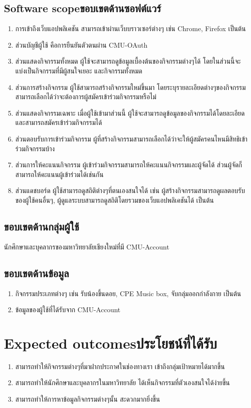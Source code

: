 \subsection{\ifenglish Software scope\else ขอบเขตด้านซอฟต์แวร์\fi}
\begin{enumerate}
    \item การเข้าถึงเว็บแอปพลิเคชัน สามารถเข้าผ่านเว็บบราวเซอร์ต่างๆ เช่น Chrome, Firefox เป็นต้น
    \item ส่วนบัญชีผู้ใช้ คือการยืนยันตัวตนผ่าน CMU-OAuth
    \item ส่วนแสดงกิจกรรมทั้งหมด ผู้ใช้จะสามารถดูข้อมูลเบื้องต้นของกิจกรรมต่างๆได้ โดยในส่วนนี้จะแบ่งเป็นกิจกรรมที่มีผู้สนใจเยอะ และกิจกรรมทั้งหมด
    \item ส่วนการสร้างกิจกรรม ผู้ใช้สามารถสร้างกิจกรรมใหม่ขึ้นมา โดยระบุรายละเอียดต่างๆของกิจกรรม สามารถเลือกได้ว่าจะต้องการผู้สมัครเข้าร่วมกิจกรรมหรือไม่
    \item ส่วนแสดงกิจกรรมเฉพาะ เมื่อผู้ใช้เข้ามาส่วนนี้ ผู้ใช้จะสามารถดูข้อมูลของกิจกรรมได้โดยละเอียด และสามารถสมัครเข้าร่วมกิจกรรมได้
    \item ส่วนตอบรับการเข้าร่วมกิจกรรม ผู้ที่สร้างกิจกรรมสามารถเลือกได้ว่าจะให้ผู้สมัครคนไหนมีสิทธิเข้าร่วมกิจกรรมบ้าง
    \item ส่วนการให้คะแนนกิจกรรม ผู้เข้าร่วมกิจกรรมสามารถให้คะแนนกิจกรรมและผู้จัดได้ ส่วนผู้จัดก็สามารถให้คะแนนผู้เข้าร่วมได้เช่นกัน
    \item ส่วนแดชบอร์ด ผู้ใช้สามารถดูสถิติต่างๆที่ตนเองสนใจได้ เช่น ผู้สร้างกิจกรรมสามารถดูผลตอบรับของผู้ใช้คนอื่นๆ, ผู้ดูแลระบบสามารถดูสถิติโดยรวมของเว็บแอปพลิเคชันได้ เป็นต้น
\end{enumerate}

\subsection{ขอบเขตด้านกลุ่มผู้ใช้}
นักศึกษาและบุคลากรของมหาวิทยาลัยเชียงใหม่ที่มี CMU-Account

\subsection{ขอบเขตด้านข้อมูล}
\begin{enumerate}
    \item กิจกรรมประเภทต่างๆ เช่น รับน้องขึ้นดอย, CPE Music box, จับกลุ่มออกกำลังกาย เป็นต้น
    \item ข้อมูลของผู้ใช้ที่ได้รับจาก CMU-Account
\end{enumerate}

\section{\ifenglish Expected outcomes\else ประโยชน์ที่ได้รับ\fi}
\begin{enumerate}
    \item สามารถทำให้กิจกรรมต่างๆที่มาฝากประกาศในช่องทางเรา เข้าถึงกลุ่มเป้าหมายได้มากขึ้น
    \item สามารถทำให้นักศึกษาและบุคลากรในมหาวิทยาลัย ได้เห็นกิจกรรมที่ตัวเองสนใจได้ง่ายขึ้น
    \item สามารถทำให้การหาข้อมูลกิจกรรมต่างๆนั้น สะดวกมากยิ่งขึ้น
\end{enumerate}

